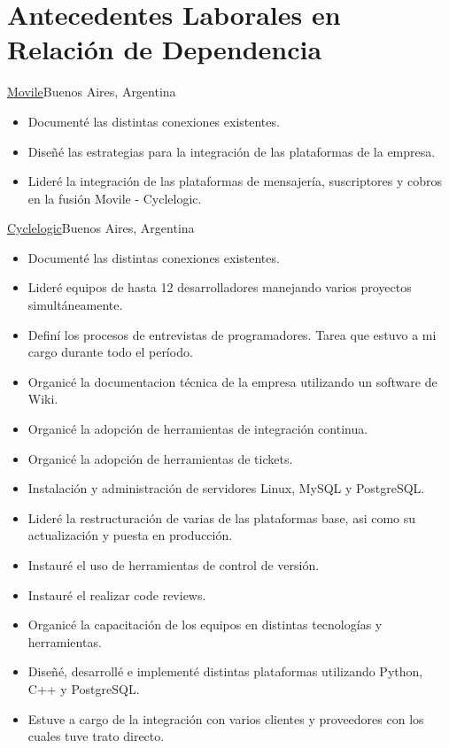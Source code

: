 \documentclass[a4paper,11pt]{moderncv}
\newcommand\weblink[2] {{\color{href} \href{#1}{#2}}}
\begin{document}
\section{Antecedentes Laborales en Relaci\'on de Dependencia}
{\weblink{http://www.movile.com}{Movile}}{Buenos Aires, Argentina}{}{%
\begin{itemize}
  \item Document\'e las distintas conexiones existentes.
  \item Dise\~n\'e las estrategias para la integraci\'on de las plataformas de la empresa.
  \item Lider\'e la integraci\'on de las plataformas de mensajer\'ia, suscriptores y cobros en la fusi\'on Movile - Cyclelogic.
\end{itemize}
}
%
{\weblink{http://www.cyclelogic.com}{Cyclelogic}}{Buenos Aires, Argentina}{}{%
\begin{itemize}
  \item Document\'e las distintas conexiones existentes.
  \item Lider\'e equipos de hasta 12 desarrolladores manejando varios proyectos simult\'aneamente.
  \item Defin\'i los procesos de entrevistas de programadores. Tarea que estuvo a mi cargo durante todo el per\'iodo.
  \item Organic\'e la documentacion t\'ecnica de la empresa utilizando un software de Wiki.
  \item Organic\'e la adopci\'on de herramientas de integraci\'on continua.
  \item Organic\'e la adopci\'on de herramientas de tickets.
  \item Instalaci\'on y administraci\'on de servidores Linux, MySQL y PostgreSQL.
  \item Lider\'e la restructuraci\'on de varias de las plataformas base, asi como su actualizaci\'on y puesta en producci\'on.
  \item Instaur\'e el uso de herramientas de control de versi\'on.
  \item Instaur\'e el realizar code reviews.
  \item Organic\'e la capacitaci\'on de los equipos en distintas tecnolog\'ias y herramientas.
  \item Dise\~n\'e, desarroll\'e e implement\'e distintas plataformas utilizando Python, C++ y PostgreSQL.
  \item Estuve a cargo de la integraci\'on con varios clientes y proveedores con los cuales tuve trato directo.
\end{itemize}
}
\end{document}
